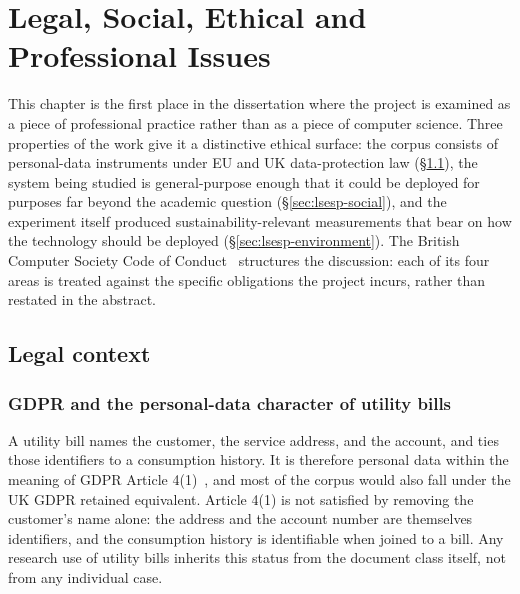 \chapter{Legal, Social, Ethical and Professional Issues}
\label{ch:lsesp}

This chapter is the first place in the dissertation where the project is examined as
a piece of professional practice rather than as a piece of computer science. Three
properties of the work give it a distinctive ethical surface: the corpus consists of
personal-data instruments under EU and UK data-protection law (\S\ref{sec:lsesp-legal}),
the system being studied is general-purpose enough that it could be deployed for
purposes far beyond the academic question (\S\ref{sec:lsesp-social}), and the experiment
itself produced sustainability-relevant measurements that bear on how the technology
should be deployed (\S\ref{sec:lsesp-environment}). The British Computer Society
Code of Conduct~\cite{bcs2022} structures the discussion: each of its four areas is
treated against the specific obligations the project incurs, rather than restated in
the abstract.

\section{Legal context}
\label{sec:lsesp-legal}

\subsection{GDPR and the personal-data character of utility bills}

A utility bill names the customer, the service address, and the account, and ties
those identifiers to a consumption history. It is therefore personal data within
the meaning of GDPR Article 4(1)~\cite{eu_gdpr_2016}, and most of the corpus would
also fall under the UK GDPR retained equivalent. Article 4(1) is not satisfied by
removing the customer's name alone: the address and the account number are themselves
identifiers, and the consumption history is identifiable when joined to a bill. Any
research use of utility bills inherits this status from the document class itself,
not from any individual case.

